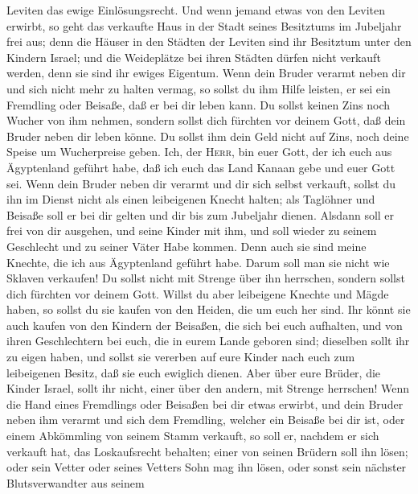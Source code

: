 Leviten das ewige Einlösungsrecht.  Und wenn jemand etwas
von den Leviten erwirbt, so geht das verkaufte Haus in der Stadt seines
Besitztums im Jubeljahr frei aus; denn die Häuser in den Städten der
Leviten sind ihr Besitztum unter den Kindern Israel;  und
die Weideplätze bei ihren Städten dürfen nicht verkauft werden, denn sie
sind ihr ewiges Eigentum.  Wenn dein Bruder verarmt neben
dir und sich nicht mehr zu halten vermag, so sollst du ihm Hilfe
leisten, er sei ein Fremdling oder Beisaße, daß er bei dir leben kann.
 Du sollst keinen Zins noch Wucher von ihm nehmen,
sondern sollst dich fürchten vor deinem Gott, daß dein Bruder neben dir
leben könne.  Du sollst ihm dein Geld nicht auf Zins,
noch deine Speise um Wucherpreise geben.  Ich, der
\textsc{Herr}, bin euer Gott, der ich euch aus Ägyptenland geführt habe,
daß ich euch das Land Kanaan gebe und euer Gott sei. 
Wenn dein Bruder neben dir verarmt und dir sich selbst verkauft, sollst
du ihn im Dienst nicht als einen leibeigenen Knecht halten;
 als Taglöhner und Beisaße soll er bei dir gelten und dir
bis zum Jubeljahr dienen.  Alsdann soll er frei von dir
ausgehen, und seine Kinder mit ihm, und soll wieder zu seinem Geschlecht
und zu seiner Väter Habe kommen.  Denn auch sie sind
meine Knechte, die ich aus Ägyptenland geführt habe. Darum soll man sie
nicht wie Sklaven verkaufen!  Du sollst nicht mit Strenge
über ihn herrschen, sondern sollst dich fürchten vor deinem Gott.
 Willst du aber leibeigene Knechte und Mägde haben, so
sollst du sie kaufen von den Heiden, die um euch her sind.
 Ihr könnt sie auch kaufen von den Kindern der Beisaßen,
die sich bei euch aufhalten, und von ihren Geschlechtern bei euch, die
in eurem Lande geboren sind; dieselben sollt ihr zu eigen haben,
 und sollst sie vererben auf eure Kinder nach euch zum
leibeigenen Besitz, daß sie euch ewiglich dienen. Aber über eure Brüder,
die Kinder Israel, sollt ihr nicht, einer über den andern, mit Strenge
herrschen!  Wenn die Hand eines Fremdlings oder Beisaßen
bei dir etwas erwirbt, und dein Bruder neben ihm verarmt und sich dem
Fremdling, welcher ein Beisaße bei dir ist, oder einem Abkömmling von
seinem Stamm verkauft,  so soll er, nachdem er sich
verkauft hat, das Loskaufsrecht behalten; einer von seinen Brüdern soll
ihn lösen;  oder sein Vetter oder seines Vetters Sohn mag
ihn lösen, oder sonst sein nächster Blutsverwandter aus seinem

